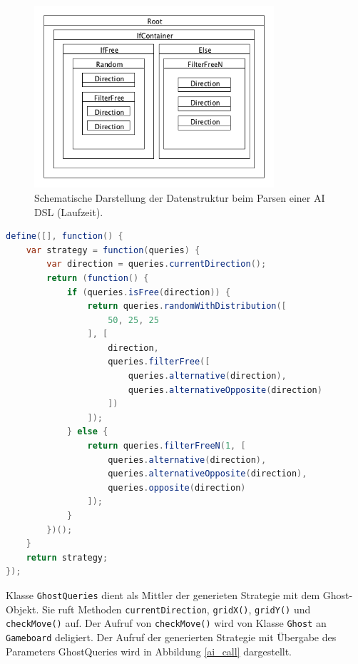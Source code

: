 \documentclass[conference]{IEEEtran}
\begin{document}
\begin{figure}[!htb]
\centering
\includegraphics[width=3.5in]{node_structure_ex.png}
\caption{Schematische Darstellung der Datenstruktur beim Parsen einer AI DSL (Laufzeit).}
\label{node_structure_ex}
\end{figure}

\begin{lstlisting}[language=Java, captionpos=b, caption=Beispiel zu generiertem JavaScript-Code einer AI DSL, label=if_free_output]
 define([], function() {
    var strategy = function(queries) {
        var direction = queries.currentDirection();
        return (function() {
            if (queries.isFree(direction)) {
                return queries.randomWithDistribution([
                    50, 25, 25
                ], [
                    direction,
                    queries.filterFree([
                        queries.alternative(direction),
                        queries.alternativeOpposite(direction)
                    ])
                ]);
            } else {
                return queries.filterFreeN(1, [
                    queries.alternative(direction),
                    queries.alternativeOpposite(direction),
                    queries.opposite(direction)
                ]);
            }
        })();
    }
    return strategy;
});
\end{lstlisting}


Klasse \texttt{GhostQueries} dient als Mittler der generieten Strategie mit dem Ghost-Objekt. Sie ruft Methoden \texttt{currentDirection}, \texttt{gridX()}, \texttt{gridY()} und \texttt{checkMove()} auf. Der Aufruf von \texttt{checkMove()} wird von Klasse \texttt{Ghost} an \texttt{Gameboard} deligiert.
Der Aufruf der generierten Strategie mit Übergabe des Parameters GhostQueries wird in Abbildung \ref{ai_call} dargestellt.
\end{document}
